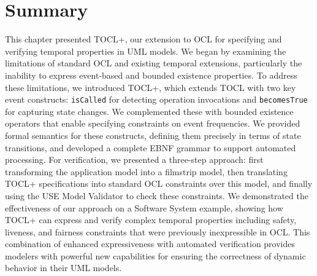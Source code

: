 \section{Summary}
\hspace{1cm} This chapter presented TOCL+, our extension to OCL for specifying and 
verifying temporal properties in UML models. We began by examining the limitations 
of standard OCL and existing temporal extensions, particularly the inability to 
express event-based and bounded existence properties. To address these limitations, 
we introduced TOCL+, which extends TOCL with two key event constructs: 
\texttt{isCalled} for detecting operation invocations and \texttt{becomesTrue} for 
capturing state changes. We complemented these with bounded existence operators that 
enable specifying constraints on event frequencies. We provided formal semantics for 
these constructs, defining them precisely in terms of state transitions, and developed 
a complete EBNF grammar to support automated processing. For verification, we presented 
a three-step approach: first transforming the application model into a filmstrip model, 
then translating TOCL+ specifications into standard OCL constraints over this model, 
and finally using the USE Model Validator to check these constraints. We demonstrated 
the effectiveness of our approach on a Software System example, showing how TOCL+ 
can express and verify complex temporal properties including safety, liveness, and 
fairness constraints that were previously inexpressible in OCL. This combination of 
enhanced expressiveness with automated verification provides modelers with powerful 
new capabilities for ensuring the correctness of dynamic behavior in their UML models.